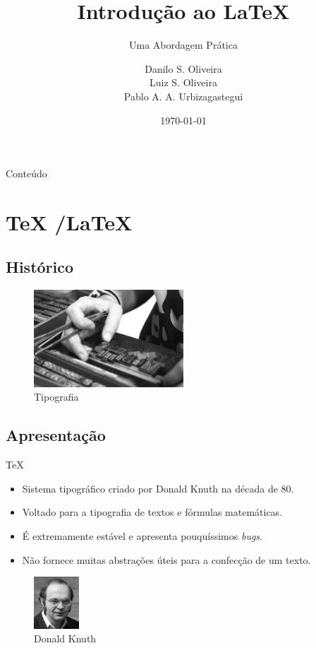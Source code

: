 \documentclass [11pt, a4paper]{beamer}
\title {Introdução ao \LaTeX{}}
\subtitle{Uma Abordagem Prática}
\author[Danilo, Luiz, Pablo]{
    Danilo S. Oliveira\\
    Luiz S. Oliveira\\
    Pablo A. A. Urbizagastegui
}
\institute[]{Universidade de Brasília}
\date {\today}
\begin{document}
\frame{\titlepage}

\begin {frame}{Conteúdo}
\begin{multicols}{2}
  \tableofcontents
\end{multicols}
\end {frame}

\section {\TeX{} /\LaTeX{}}
\subsection {Histórico}
\begin{frame}
\begin{figure}[htbp]
    \centering
        \includegraphics[width=0.5\textwidth]{Figures/tipografia.jpeg}
    \caption{Tipografia}
    \label{fig:tipografia}
\end{figure}
\end{frame}

\subsection {Apresentação}
\begin{frame}{\TeX{}}
    \begin{itemize}
        \item Sistema tipográfico criado por Donald Knuth na década de 80.
        \item Voltado para a tipografia de textos e fórmulas matemáticas.
        \item É extremamente estável e apresenta pouquíssimos \textit{bugs}.
        \item Não fornece muitas abstrações úteis para a confecção de um texto.
    \end{itemize}
\begin{figure}[htbp]
    \centering
    \includegraphics[width=0.15\textwidth]{Figures/donald.jpeg}
    \caption{Donald Knuth}
    \label{fig:tipografia}
\end{figure}
\end{frame}
\end{document}
